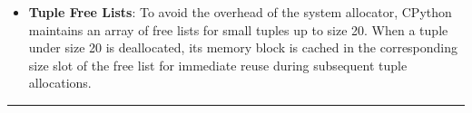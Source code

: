 \begin{itemize}
\tightlist
\item
  \textbf{Tuple Free Lists}: To avoid the overhead of the system
  allocator, CPython maintains an array of free lists for small tuples
  up to size 20. When a tuple under size 20 is deallocated, its memory
  block is cached in the corresponding size slot of the free list for
  immediate reuse during subsequent tuple allocations.
\end{itemize}

\begin{center}\rule{0.5\linewidth}{0.5pt}\end{center}
